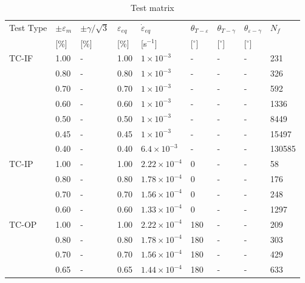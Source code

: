 \documentclass[preprint,5p,twocolumn,11pt,sort&compress]{elsarticle}
\begin{document}
\begin{table*}[htbp]
  \centering
  \caption{Test matrix} \vspace{0.1cm}
    \begin{tabular}{p{2cm}p{1.5cm}p{1.5cm}p{1.5cm}p{2.5cm}p{1cm}p{1cm}p{1cm}p{1cm}}
    \hline
    Test Type & $\pm \varepsilon _m$ & $\pm \gamma/ \sqrt 3$ & $\varepsilon _{eq}$ & $\dot \varepsilon _{eq}$ & $\theta_{T-\varepsilon}$ & $\theta_{T-\gamma}$ & $\theta_{\varepsilon-\gamma}$ & $N_f$ \\
          & [\%]  & [\%]  & [\%]  & [s$^{-1}$] & [$^\circ$] & [$^\circ$] & [$^\circ$] &  \\
    \hline
    TC-IF & 1.00  & -     & 1.00  & $1\times 10^{-3}$ & -     & -     & -     & 231 \\
          & 0.80  & -     & 0.80  & $1\times 10^{-3}$ & -     & -     & -     & 326 \\
          & 0.70  & -     & 0.70  & $1\times 10^{-3}$ & -     & -     & -     & 592 \\
          & 0.60  & -     & 0.60  & $1\times 10^{-3}$ & -     & -     & -     & 1336 \\
          & 0.50  & -     & 0.50  & $1\times 10^{-3}$ & -     & -     & -     & 8449 \\
          & 0.45  & -     & 0.45  & $1\times 10^{-3}$ & -     & -     & -     & 15497 \\
          & 0.40  & -     & 0.40  & $6.4\times 10^{-3}$ & -     & -     & -     & 130585 \\
    \hline
    TC-IP & 1.00  & -     & 1.00  & $2.22\times 10^{-4}$ & 0     & -     & -     & 58 \\
          & 0.80  & -     & 0.80  & $1.78\times 10^{-4}$ & 0     & -     & -     & 176 \\
          & 0.70  & -     & 0.70  & $1.56\times 10^{-4}$ & 0     & -     & -     & 248 \\
          & 0.60  & -     & 0.60  & $1.33\times 10^{-4}$ & 0     & -     & -     & 1297 \\
    \hline
    TC-OP & 1.00  & -     & 1.00  & $2.22\times 10^{-4}$ & 180   & -     & -     & 209 \\
          & 0.80  & -     & 0.80  & $1.78\times 10^{-4}$ & 180   & -     & -     & 303 \\
          & 0.70  & -     & 0.70  & $1.56\times 10^{-4}$ & 180   & -     & -     & 429 \\
          & 0.65  & -     & 0.65  & $1.44\times 10^{-4}$ & 180   & -     & -     & 633 \\

\end{tabular}
\end{table*}
\end{document}
